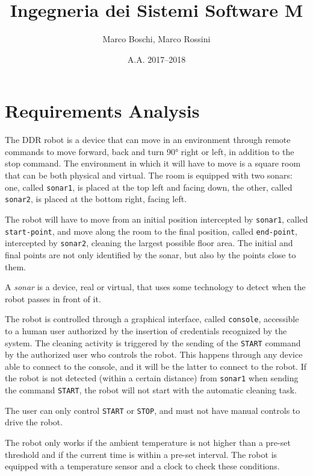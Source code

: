 

\title{Ingegneria dei Sistemi Software M}
\date{A.A. 2017--2018}
\author{Marco Boschi, Marco Rossini}



\maketitletoc

\section{Requirements Analysis}
The DDR robot is a device that can move in an environment through remote commands to move forward, back and turn \ang{90} right or left, in addition to the stop command. The environment in which it will have to move is a square room that can be both physical and virtual. The room is equipped with two sonars: one, called \texttt{sonar1}, is placed at the top left and facing down, the other, called \texttt{sonar2}, is placed at the bottom right, facing left.

The robot will have to move from an initial position intercepted by \texttt{sonar1}, called \texttt{start-point}, and move along the room to the final position, called \texttt{end-point}, intercepted by \texttt{sonar2}, cleaning the largest possible floor area. The initial and final points are not only identified by the sonar, but also by the points close to them.

A \textit{sonar} is a device, real or virtual, that uses some technology to detect when the robot passes in front of it.

The robot is controlled through a graphical interface, called \texttt{console}, accessible to a human user authorized by the insertion of credentials recognized by the system. The cleaning activity is triggered by the sending of the \texttt{START} command by the authorized user who controls the robot. This happens through any device able to connect to the console, and it will be the latter to connect to the robot. If the robot is not detected (within a certain distance) from \texttt{sonar1} when sending the command \texttt{START}, the robot will not start with the automatic cleaning task.

The user can only control \texttt{START} or \texttt{STOP}, and must not have manual controls to drive the robot.

The robot only works if the ambient temperature is not higher than a pre-set threshold and if the current time is within a pre-set interval. The robot is equipped with a temperature sensor and a clock to check these conditions.

